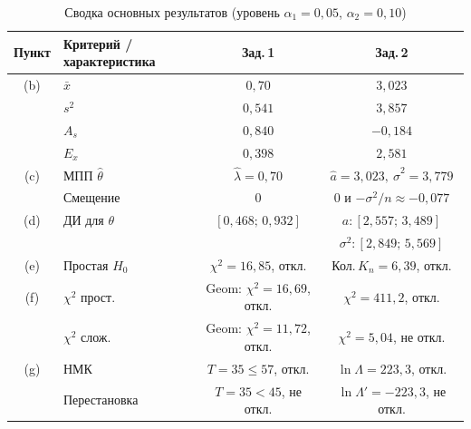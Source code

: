 \documentclass[12pt,a4paper]{article}
\newcommand{\lahat}{\hat{\lambda}}
\newcommand{\ahat}{\hat{a}}
\newcommand{\shat}{\hat{\sigma}^2}
\newcommand{\xbar}{\bar{x}}
\begin{document}
	\begin{table}[H]
		\centering
		\renewcommand{\arraystretch}{1.3}
		\begin{tabular}{clcc}
			\toprule
			\textbf{Пункт} & \textbf{Критерий / характеристика} & \textbf{Зад.\,1} & \textbf{Зад.\,2} \\
			\midrule
			(b) & $\xbar$ & $0{,}70$ & $3{,}023$ \\
			& $s^2$   & $0{,}541$ & $3{,}857$ \\
			& $A_s$   & $0{,}840$ & $-0{,}184$ \\
			& $E_x$   & $0{,}398$ & $2{,}581$ \\
			\midrule
			(c) & МПП $\hat\theta$ & $\lahat=0{,}70$ & $\ahat=3{,}023,\ \shat=3{,}779$ \\
			& Смещение & $0$ & $0$ и $-\sigma^2/n \approx -0{,}077$ \\
			\midrule
			(d) & ДИ для $\theta$ & $[0{,}468;\,0{,}932]$ & $a\!:[2{,}557;\,3{,}489]$ \\
			&                  &                        & $\sigma^2\!:[2{,}849;\,5{,}569]$ \\
			\midrule
			(e) & Простая $H_0$ & $\chi^2=16{,}85$, откл. & Кол.\,$K_n=6{,}39$, откл. \\
			\midrule
			(f) & $\chi^2$ прост. & Geom: $\chi^2=16{,}69$, откл. & $\chi^2=411{,}2$, откл. \\
			& $\chi^2$ слож.  & Geom: $\chi^2=11{,}72$, откл. & $\chi^2=5{,}04$, не откл. \\
			\midrule
			(g) & НМК & $T=35\le 57$, откл. & $\ln\Lambda=223{,}3$, откл. \\
			& Перестановка & $T=35<45$, не откл. & $\ln\Lambda'=-223{,}3$, не откл. \\
			\bottomrule
		\end{tabular}
		\caption{Сводка основных результатов (уровень $\alpha_1=0{,}05$, $\alpha_2=0{,}10$)}
	\end{table}
	
\end{document}
